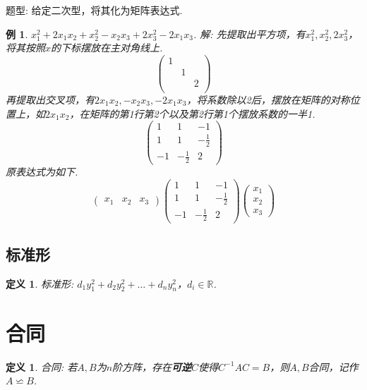 \documentclass[12pt, a4paper, oneside]{ctexbook}
\newtheorem{definition}[theorem]{定义}
\newtheorem{example}[theorem]{例}
\begin{document}
题型: 给定二次型，将其化为矩阵表达式. 

\begin{example}
    $x_1^2 + 2x_1x_2 + x_2^2 - x_2x_3 + 2x_3^2 - 2x_1x_3$. 
    \newline
    解: 先提取出平方项，有$x_1^2, x_2^2, 2x_3^2$，将其按照$x$的下标摆放在主对角线上. 
    $$\begin{pmatrix}
        1 &   &   \\
          & 1 &   \\
          &   & 2 \\
    \end{pmatrix}$$
    再提取出交叉项，有$2x_1x_2,-x_2x_3,-2x_1x_3$，将系数除以2后，摆放在矩阵的对称位置上，如$2x_1x_2$，在矩阵的第1行第2个以及第2行第1个摆放系数的一半1. 
    $$\begin{pmatrix}
        1 & 1 & -1 \\
        1 & 1 & -\frac{1}{2} \\
        -1 & -\frac{1}{2} & 2
    \end{pmatrix}$$
    原表达式为如下. 
    $$\begin{pmatrix}
        x_1 & x_2 & x_3
    \end{pmatrix} \begin{pmatrix}
        1 & 1 & -1 \\
        1 & 1 & -\frac{1}{2} \\
        -1 & -\frac{1}{2} & 2
    \end{pmatrix} \begin{pmatrix}
        x_1 \\ x_2 \\ x_3
    \end{pmatrix}$$
\end{example}

\subsection{标准形}

\begin{definition}
    标准形: $d_1y_1^2 + d_2y_2^2 + \dots + d_ny_n^2$，$d_i \in \mathbb{R}$. 
\end{definition}

\section{合同}

\begin{definition}
    合同: 若$A,B$为$n$阶方阵，存在\textbf{可逆}$C$使得$C^{-1}AC = B$，则$A,B$合同，记作$A \backsimeq B$. 
\end{definition}
\end{document}
